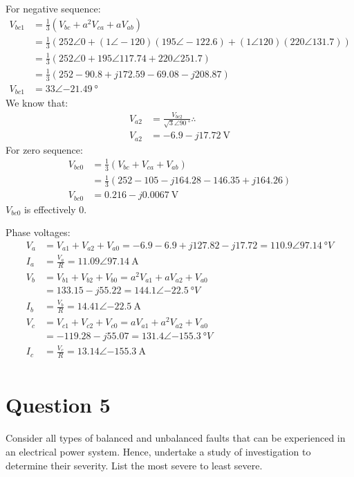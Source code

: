 For negative sequence:
\begin{align}
    V_{bc1} &= \frac{1}{3}\left(V_{bc}+a^2V_{ca}+aV_{ab}\right)\\
    &= \frac{1}{3}\left(252\angle 0 + \left(1\angle -120\right)\left(195\angle -122.6\right)+\left(1\angle 120\right)\left(220\angle 131.7\right)\right)\\
    &= \frac{1}{3}\left(252\angle 0 + 195\angle 117.74+220\angle 251.7\right)\\
    &= \frac{1}{3}\left(252 -90.8 +j172.59 -69.08-j208.87\right)\\
    V_{bc1} &= 33\angle \SI{-21.49}{\degree}
\end{align}
We know that:
\begin{align}
    V_{a2} &= \frac{V_{bc2}}{\sqrt{3}\angle\SI{90}{\degree}}\therefore \\
    V_{a2} &= -6.9-j\SI{17.72}{\volt}
\end{align}
For zero sequence:
\begin{align}
    V_{bc0} &= \frac{1}{3}\left(V_{bc}+V_{ca}+V_{ab}\right)\\
    &= \frac{1}{3}\left(252-105-j164.28-146.35+j164.26\right)\\
    V_{bc0} &= 0.216-j\SI{0.0067}{\volt}
\end{align}
$V_{bc0}$ is effectively 0.

Phase voltages:
\begin{align}
    V_a &= V_{a1}+V_{a2}+V_{a0} = -6.9-6.9+j127.82-j17.72 = 110.9\angle\SI{97.14}{\degree V}\\
    I_a &= \frac{V_a}{R} = 11.09\angle\SI{97.14}{\ampere}\\
    V_b &= V_{b1}+V_{b2}+V_{b0} = a^2 V_{a1} + a V_{a2} + V_{a0}\\
        &= 133.15-j55.22 = 144.1\angle\SI{-22.5}{\degree V}\\
    I_b &= \frac{V_b}{R} = 14.41\angle\SI{-22.5}{\ampere}\\    
    V_c &= V_{c1}+V_{c2}+V_{c0} = a V_{a1} + a^2 V_{a2} + V_{a0}\\
        &= -119.28 -j55.07 = 131.4\angle\SI{-155.3}{\degree V}\\
    I_c &= \frac{V_c}{R} = 13.14\angle\SI{-155.3}{\ampere}\\
\end{align}
\section{Question 5}
Consider all types of balanced and unbalanced faults that can be experienced in an electrical power system. Hence, undertake a study of investigation to determine their severity. List the most severe to least severe.

